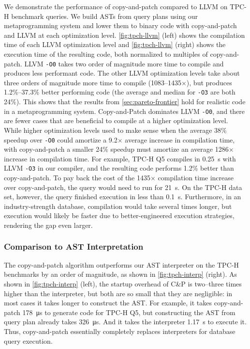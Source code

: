 \documentclass[acmsmall,nonacm,screen]{acmart}\settopmatter{printfolios=true,printccs=true,printacmref=false}
\newcommand{\figref}[1]{\autoref{#1}}
\newcommand{\secref}[1]{\autoref{#1}}
\newcommand{\llvm}{LLVM}
\newcommand{\ozero}{\texttt{-O0}}
\newcommand{\othree}{\texttt{-O3}}
\newcommand{\cp}{copy-and-patch}
\newcommand{\cpcap}{Copy-and-Patch}
\newcommand{\cpshort}{C\&P}
\newcommand{\X}{$\times$}
\begin{document}
We demonstrate the performance of \cp{} compared to \llvm{} on TPC-H benchmark queries. We build ASTs from query plans using our metaprogramming system and lower them to binary code with \cp{} and \llvm{} at each optimization level. \figref{fig:tpch-llvm} (left) shows the compilation time of each \llvm{} optimization level and \figref{fig:tpch-llvm} (right) shows the execution time of the resulting code, both normalized to multiples of \cp{}. \llvm{} \ozero{} takes two order of magnitude more time to compile and produces less performant code. The other \llvm{} optimization levels take about three orders of magnitude more time to compile (\num{1083}--\num{1435}\X{}), but produces 1.2\%--37.3\% better performing code (the average and median for \othree{} are both 24\%). This shows that the results from \secref{sec:pareto-frontier} hold for realistic code in a metaprogramming system. \cpcap{} dominates \llvm{} \ozero{}, and there are fewer cases that are beneficial to compile at a higher optimization level. While higher optimization levels used to make sense when the average 38\% speedup over \ozero{} could amortize a \num{9.2}\X{} average increase in compilation time, with \cp{} a smaller 24\% speedup must amortize an average \num{1286}\X{} increase in compilation time. For example, TPC-H Q5 compiles in \SI{0.25}{\second} with \llvm{} \othree{} in our compiler, and the resulting code performs 1.2\% better than \cp{}. To pay back the cost of the \num{1435}\X{} compilation time increase over \cp, the query would need to run for \SI{21}{\second}. On the TPC-H data set, however, the query finished execution in less than \SI{0.1}{\second}. Furthermore, in an industry-strength database, compilation would take several times longer, but execution would likely be faster due to better-engineered execution strategies, rendering the gap even larger.


\subsubsection*{Comparison to AST Interpretation}

The \cp{} algorithm outperforms our AST interpreter on the TPC-H benchmarks by an order of magnitude, as shown in \figref{fig:tpch-interp} (right). As shown in \figref{fig:tpch-interp} (left), the startup overhead of \cpshort{} is two--three times higher than the interpreter, but both are so small that they are negligible: in most cases it takes longer to construct the AST. For example, it takes \cp{} \SI{178}{\micro\second} to generate code for TPC-H Q5, but constructing the AST from query plan already takes \SI{326}{\micro\second}. And it takes the interpreter \SI{1.17}{\second} to execute it. Thus, \cp{} essentially completely replaces interpreters for database query execution.
\end{document}
